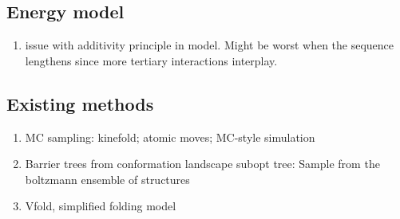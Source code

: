 \documentclass[a4paper,12pt]{article}
\begin{document}
\subsection{Energy model}
\label{sec:org0ce990e}
\begin{enumerate}
\item issue with additivity principle in model. Might be worst when the sequence
lengthens since more tertiary interactions interplay.
\end{enumerate}
\subsection{Existing methods}
\label{sec:orgb299693}
\begin{enumerate}
\item MC sampling: kinefold; atomic moves; MC-style simulation
\item Barrier trees from conformation landscape subopt tree: Sample from the
boltzmann ensemble of structures
\item Vfold, simplified folding model
\end{enumerate}

\clearpage
\end{document}
